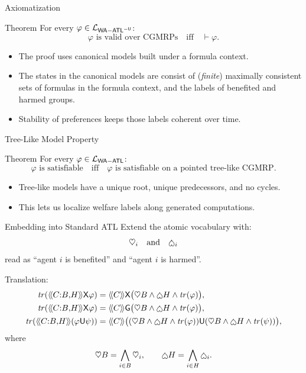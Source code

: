 \documentclass[aspectratio=169,10pt]{beamer}
\newcommand{\tr}{\mathit{tr}}
\begin{document}
\begin{frame}{Axiomatization}
  \begin{block}{Theorem}
    For every $\varphi\in\mathcal{L}_{\mathsf{WA{-}ATL}^{-\mathsf{U}}}$:
    \[
      \varphi \text{ is valid over CGMRPs}
      \quad\text{iff}\quad
      \vdash \varphi.
    \]
  \end{block}

  \vspace{0.4em}
  \begin{itemize}
    \item The proof uses canonical models built under a formula context.
    \item The states in the canonical models are consist of (\emph{finite}) maximally consistent sets of formulas in the formula context, and the labels of benefited and harmed groups.
    \item Stability of preferences keeps those labels coherent over time.
  \end{itemize}
\end{frame}

\begin{frame}{Tree-Like Model Property}
  \begin{block}{Theorem}
    For every $\varphi\in\mathcal{L}_{\mathsf{WA{-}ATL}}$:
    \[
      \varphi \text{ is satisfiable}
      \quad\text{iff}\quad
      \varphi \text{ is satisfiable on a pointed tree-like CGMRP}.
    \]
  \end{block}

  \vspace{0.7em}
  \begin{itemize}
    \item Tree-like models have a unique root, unique predecessors, and no cycles.
    \item This lets us localize welfare labels along generated computations.
  \end{itemize}
\end{frame}

\begin{frame}{Embedding into Standard ATL}
  Extend the atomic vocabulary with:
  \[
    \help_i \quad\text{and}\quad \harm_i
  \]
  read as ``agent $i$ is benefited'' and ``agent $i$ is harmed''.

  \vspace{0.4em}
  Translation:
  \begin{align*}
  \tr(\atlbh{C}{B}{H}\X\varphi)
  &=
  \atlop{C}\X
  \bigl(\help B \wedge \harm H \wedge \tr(\varphi)\bigr),\\
  \tr(\atlbh{C}{B}{H}\X\varphi)
  &=
  \atlop{C}\G
  \bigl(\help B \wedge \harm H \wedge \tr(\varphi)\bigr),\\
  \tr(\atlbh{C}{B}{H}(\varphi \U \psi))
  &=
  \atlop{C}
  \bigl((\help B \wedge \harm H \wedge \tr(\varphi))\U (\help B \wedge \harm H \wedge \tr(\psi) )\bigr),
  \end{align*}
  where
  \[
    \help B = \bigwedge_{i\in B}\help_i,
    \qquad
    \harm H = \bigwedge_{i\in H}\harm_i.
  \]
\end{frame}
\end{document}
